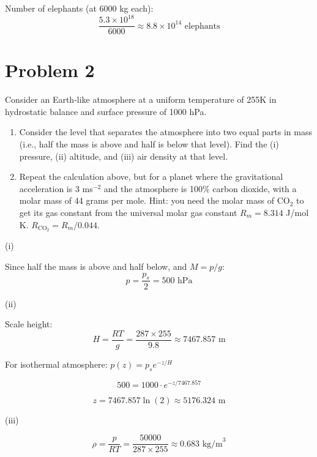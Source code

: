 \documentclass[letterpaper, 11pt]{article}
\newcommand{\1}{\mathds{1}}	%
\theoremstyle{definition}
\begin{document}
Number of elephants (at 6000 kg each):
\begin{equation*}
\frac{5.3 \times 10^{18}}{6000} \approx 8.8 \times 10^{14} \text{ elephants}
\end{equation*}

\section*{Problem 2}
Consider an Earth-like atmosphere at a uniform temperature of 255K in hydrostatic balance and surface pressure of 1000 hPa.

\begin{enumerate}
    \item[(a)] Consider the level that separates the atmosphere into two equal parts in mass (i.e., half the mass is above and half is below that level). Find the (i) pressure, (ii) altitude, and (iii) air density at that level.
    
    \item[(b)] Repeat the calculation above, but for a planet where the gravitational acceleration is 3 ms$^{-2}$ and the atmosphere is 100\% carbon dioxide, with a molar mass of 44 grams per mole. Hint: you need the molar mass of CO$_2$ to get its gas constant from the universal molar gas constant $R_m = 8.314$ J/mol K. $R_{\text{CO}_2} = R_m/0.044$.
\end{enumerate}


(i)

Since half the mass is above and half below, and $M = p/g$:
\begin{equation*}
p = \frac{p_s}{2} = 500 \text{ hPa}
\end{equation*}

(ii)

Scale height: 
\begin{equation*}
H = \frac{RT}{g} = \frac{287 \times 255}{9.8} \approx 7467.857 \text{ m}
\end{equation*}

For isothermal atmosphere: $p(z) = p_s e^{-z/H}$

\begin{equation*}
500 = 1000 \cdot e^{-z/7467.857}
\end{equation*}

\begin{equation*}
z = 7467.857 \ln(2) \approx 5176.324 \text{ m}
\end{equation*}

(iii) 

\begin{equation*}
\rho = \frac{p}{RT} = \frac{50000}{287 \times 255} \approx 0.683 \text{ kg/m}^3
\end{equation*}
\end{document}
